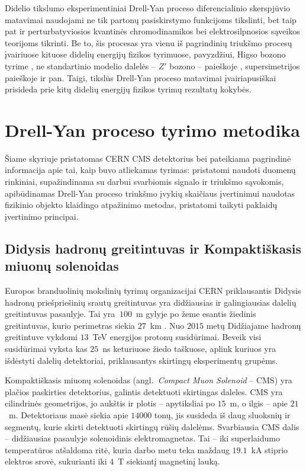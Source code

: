 \documentclass[a4paper, 12pt, oneside]{article}
\begin{document}
Didelio tikslumo eksperimentiniai Drell-Yan proceso diferencialinio skerspjūvio matavimai \cite{DY2013, DY7TeVatlas, DY2015, DY8TeVatlas, DY2019}
naudojami ne tik partonų pasiskirstymo funkcijoms tikslinti, bet taip pat ir perturbatyviosios kvantinės
chromodinamikos bei elektrosilpnosios sąveikos teorijoms tikrinti.
Be to, šis procesas yra vienu iš pagrindinių triukšmo procesų įvairiuose kituose didelių energijų fizikos tyrimuose,
pavyzdžiui, Higso bozono tyrime \cite{Higgs2018}, ne standartinio modelio dalelės -- $Z'$ bozono -- paieškoje \cite{Zprime},
supersimetrijos paieškoje \cite{SUSYtau} ir pan.
Taigi, tikslūs Drell-Yan proceso matavimai įvairiapusiškai prisideda prie kitų didelių energijų
fizikos tyrimų rezultatų kokybės.


\section{Drell-Yan proceso tyrimo metodika}

Šiame skyriuje pristatomas CERN CMS detektorius bei pateikiama pagrindinė informacija apie tai, kaip buvo atliekamas
tyrimas: pristatomi naudoti duomenų rinkiniai, supažindinama su darbui svarbiomis signalo ir triukšmo sąvokomis,
apibūdinamas Drell-Yan proceso triukšmo įvykių skaičiaus įvertinimui naudotas fizikinio
objekto klaidingo atpažinimo metodas, pristatomi taikyti paklaidų įvertinimo principai.

\subsection{Didysis hadronų greitintuvas ir Kompaktiškasis miuonų solenoidas}

Europos branduolinių mokslinių tyrimų organizacijai CERN priklausantis Didysis hadronų priešpriešinių srautų
greitintuvas yra didžiausias ir galingiausias dalelių greitintuvas pasaulyje.
Tai yra $~100$~m gylyje po žeme esantis žiedinis greitintuvas, kurio perimetras siekia $27$~km \cite{LHC}.
Nuo $2015$ metų Didžiajame hadronų greitintuve vykdomi $13$~TeV energijos protonų susidūrimai.
Beveik visi susidūrimai vyksta kas $25$~ns keturiuose žiedo taškuose, aplink kuriuos yra išdėstyti dalelių
detektoriai, priklausantys skirtingų eksperimentų grupėms.

Kompaktiškasis miuonų solenoidas (angl.\ \textit{Compact Muon Solenoid} -- CMS) \cite{CMSexperiment}
yra plačios paskirties
detektorius, galintis detektuoti skirtingas daleles.
CMS yra cilindrinės geometrijos, jo aukštis ir plotis -- apytiksliai po $15$~m, o ilgis --
apie $21$~m.
Detektoriaus masė siekia apie $14000$ tonų, jis susideda iš daug sluoksnių ir segmentų, kurie skirti
detektuoti skirtingų rūšių dalelėms.
Svarbiausia CMS dalis -- didžiausias pasaulyje solenoidinis elektromagnetas.
Tai -- iki superlaidumo temperatūros atšaldoma ritė, kuria darbo metu teka maždaug $19.1$~kA stiprio
elektros srovė, sukurianti iki $4$~T siekiantį magnetinį lauką.
\end{document}
